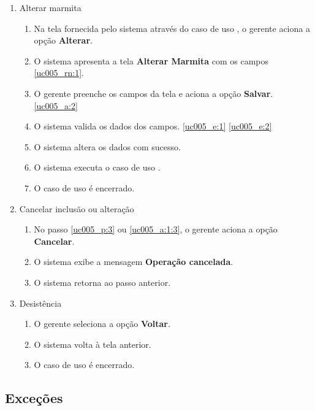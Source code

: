 \begin{enumerate}[label=A\arabic*]
	\item Alterar marmita \label{uc005_a:1}
	\begin{enumerate}[label*=.\arabic*]
		\item Na tela fornecida pelo sistema através do caso de uso , o gerente aciona a opção \textbf{Alterar}. 
		\item O sistema apresenta a tela \textbf{Alterar Marmita} com os campos \ref{uc005_rn:1}. \label{uc005_a:1:2}
		\item O gerente preenche os campos da tela e aciona a opção \textbf{Salvar}. \label{uc005_a:1:3} \ref{uc005_a:2}
		\item O sistema valida os dados dos campos. \ref{uc005_e:1} \ref{uc005_e:2}
		\item O sistema altera os dados com sucesso.
		\item O sistema executa o caso de uso .
		\item O caso de uso é encerrado.
	\end{enumerate}
	
	\item Cancelar inclusão ou alteração \label{uc005_a:2}
	\begin{enumerate}[label*=.\arabic*]
		\item No passo \ref{uc005_p:3} ou \ref{uc005_a:1:3}, o gerente aciona a opção \textbf{Cancelar}.
		\item O sistema exibe a mensagem \textbf{Operação cancelada}.
		\item O sistema retorna ao passo anterior.
	\end{enumerate}
	
	\item Desistência
	\begin{enumerate}[label*=.\arabic*]
		\item O gerente seleciona a opção \textbf{Voltar}.
		\item O sistema volta à tela anterior.
		\item O caso de uso é encerrado.		
	\end{enumerate}		 	
\end{enumerate}

\subsection{Exceções}

